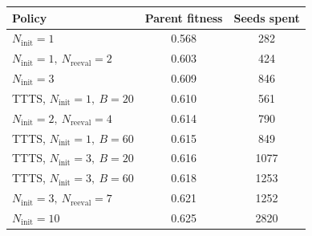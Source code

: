 \begin{tabular}{lcc}
\toprule
Policy & Parent fitness & Seeds spent \\
\midrule
$N_{\mathrm{init}}=1$                                   & 0.568 & 282 \\
$N_{\mathrm{init}}=1,\ N_{\mathrm{reeval}}=2$           & 0.603 & 424 \\
$N_{\mathrm{init}}=3$                                   & 0.609 & 846 \\
TTTS, $N_{\mathrm{init}}=1,\ B=20$                      & 0.610 & 561 \\
$N_{\mathrm{init}}=2,\ N_{\mathrm{reeval}}=4$           & 0.614 & 790 \\
TTTS, $N_{\mathrm{init}}=1,\ B=60$                      & 0.615 & 849 \\
TTTS, $N_{\mathrm{init}}=3,\ B=20$                      & 0.616 & 1077 \\
TTTS, $N_{\mathrm{init}}=3,\ B=60$                      & 0.618 & 1253 \\
$N_{\mathrm{init}}=3,\ N_{\mathrm{reeval}}=7$           & 0.621 & 1252 \\
$N_{\mathrm{init}}=10$                                  & 0.625 & 2820 \\
\bottomrule
\end{tabular}
